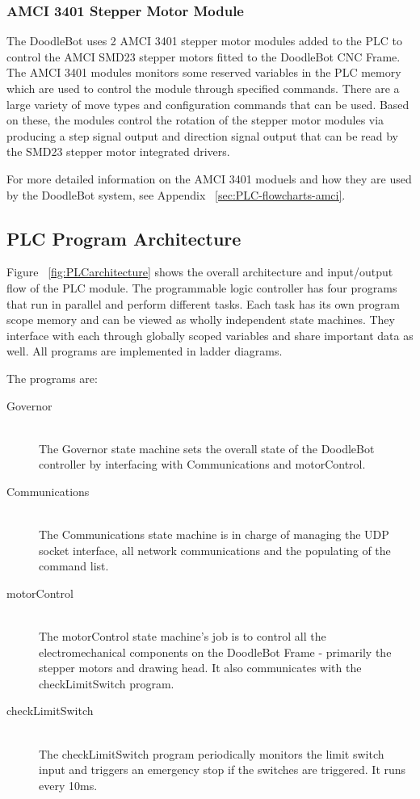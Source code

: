 	\subsubsection{AMCI 3401 Stepper Motor Module}
		The DoodleBot uses 2 AMCI 3401 stepper motor modules added to the PLC to control the AMCI SMD23 stepper motors fitted to the DoodleBot CNC Frame. The AMCI 3401 modules monitors some reserved variables in the PLC memory which are used to control the module through specified commands. There are a large variety of move types and configuration commands that can be used. Based on these, the modules control the rotation of the stepper motor modules via producing a step signal output and direction signal output that can be read by the SMD23 stepper motor integrated drivers.
		
		For more detailed information on the AMCI 3401 moduels and how they are used by the DoodleBot system, see Appendix ~\ref{sec:PLC-flowcharts-amci}.
\subsection{PLC Program Architecture}
		Figure ~\ref{fig:PLCarchitecture} shows the overall architecture and input/output flow of the PLC module. The programmable logic controller has four programs that run in parallel and perform different tasks. Each task has its own program scope memory and can be viewed as wholly independent state machines. They interface with each through globally scoped variables and share important data as well. All programs are implemented in ladder diagrams. 
		
		The programs are:	
		\begin{description}
			\item[Governor] \hfill \\
				The Governor state machine sets the overall state of the DoodleBot controller by interfacing with Communications and motorControl.
			\item[Communications] \hfill \\
				The Communications state machine is in charge of managing the UDP socket interface, all network communications and the populating of the command list.
			\item[motorControl] \hfill \\
				The motorControl state machine's job is to control all the electromechanical components on the DoodleBot Frame - primarily the stepper motors and drawing head. It also communicates with the checkLimitSwitch program.
			\item[checkLimitSwitch] \hfill \\
				The checkLimitSwitch program periodically monitors the limit switch input and triggers an emergency stop if the switches are triggered. It runs every 10ms.
		\end{description}
		
